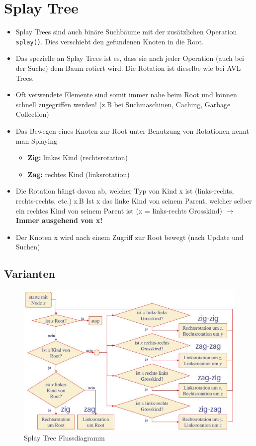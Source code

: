 \section{Splay Tree}
\begin{itemize}
	\item Splay Trees sind auch binäre Suchbäume mit der zusätzlichen Operation \lstinline|splay()|. Dies verschiebt den gefundenen Knoten in die Root.
	\item Das spezielle an Splay Trees ist es, dass sie nach jeder Operation (auch bei der Suche) dem Baum rotiert wird. Die Rotation ist dieselbe wie bei AVL Trees.
	\item Oft verwendete Elemente sind somit immer nahe beim Root und können schnell zugegriffen werden! (z.B bei Suchmaschinen, Caching, Garbage Collection)
	\item Das Bewegen eines Knoten zur Root unter Benutzung von Rotationen nennt man Splaying
	\begin{itemize}
		\item \textbf{Zig:} linkes Kind (rechtsrotation)
		\item \textbf{Zag:} rechtes Kind (linksrotation)
	\end{itemize}
	\item Die Rotation hängt davon ab, welcher Typ von Kind x ist (links-rechts, rechts-rechts, etc.) z.B Ist x das linke Kind von seinem Parent, welcher selber ein rechtes Kind von seinem Parent ist (x = links-rechts Grosskind) $\rightarrow$ \textbf{Immer ausgehend von x!}
	\item Der Knoten x wird nach einem Zugriff zur Root bewegt (nach Update und Suchen)
\end{itemize}

\subsection{Varianten}
\begin{figure}[h]
\centering
\includegraphics[width=0.9\linewidth]{images/splay_tree_flow_diagram}
\caption{Splay Tree Flussdiagramm}
\label{fig:splaytreeflowdiagram}
\end{figure}

